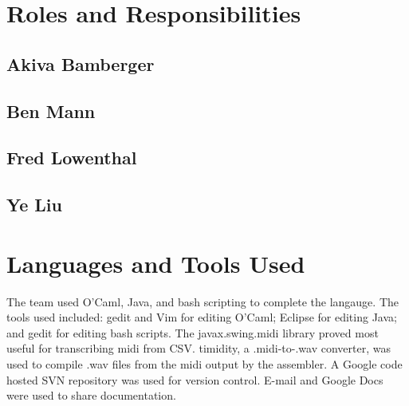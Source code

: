\documentclass[12pt,A4]{book}
\begin{document}
\section{Roles and Responsibilities}
\subsection{Akiva Bamberger}
\subsection{Ben Mann}
\subsection{Fred Lowenthal}
\subsection{Ye Liu}
\section{Languages and Tools Used}
The team used O'Caml, Java, and bash scripting to complete the langauge. The tools used included: gedit and Vim for editing O'Caml; Eclipse for editing Java; and gedit for editing bash scripts. The javax.swing.midi library proved most useful for transcribing midi from CSV. timidity, a .midi-to-.wav converter, was used to compile .wav files from the midi output by the assembler. A Google code hosted SVN repository was used for version control. E-mail and Google Docs were used to share documentation.
\end{document}

